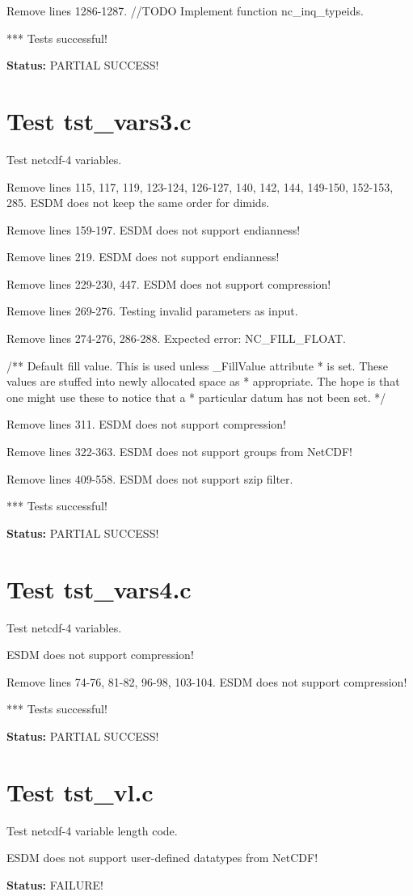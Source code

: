 Remove lines 1286-1287. //TODO Implement function nc\_inq\_typeids.

*** Tests successful!

{\bf \large Status: } PARTIAL SUCCESS!

\section{Test tst\_vars3.c}

Test netcdf-4 variables.

Remove lines 115, 117, 119, 123-124, 126-127, 140, 142, 144, 149-150, 152-153, 285. ESDM does not keep the same order for dimids.

Remove lines 159-197. ESDM does not support endianness!

Remove lines 219. ESDM does not support endianness!

Remove lines 229-230, 447. ESDM does not support compression!

Remove lines 269-276. Testing invalid parameters as input.

Remove lines 274-276, 286-288. Expected error: NC\_FILL\_FLOAT.

/** Default fill value. This is used unless \_FillValue attribute
 * is set.  These values are stuffed into newly allocated space as
 * appropriate.  The hope is that one might use these to notice that a
 * particular datum has not been set. */

Remove lines 311. ESDM does not support compression!

Remove lines 322-363. ESDM does not support groups from NetCDF!

Remove lines 409-558. ESDM does not support szip filter.

*** Tests successful!

{\bf \large Status: } PARTIAL SUCCESS!

\section{Test tst\_vars4.c}

Test netcdf-4 variables.

ESDM does not support compression!

Remove lines 74-76, 81-82, 96-98, 103-104. ESDM does not support compression!

*** Tests successful!

{\bf \large Status: } PARTIAL SUCCESS!

\section{Test tst\_vl.c}

Test netcdf-4 variable length code.

ESDM does not support user-defined datatypes from NetCDF!

{\bf \large Status: } FAILURE!
